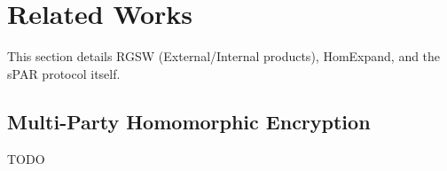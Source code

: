 \chapter{Related Works} %
\label{chp:protocol}

This section details RGSW (External/Internal products), HomExpand, and the sPAR protocol itself.






\section{Multi-Party Homomorphic Encryption}
TODO